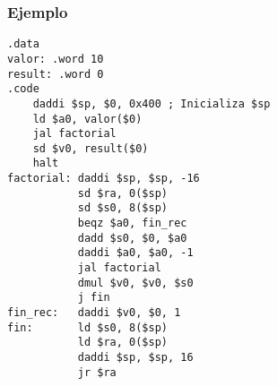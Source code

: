 \documentclass{beamer}
\begin{document}
\begin{frame}[fragile]
\frametitle{Ejemplo}
\tiny{
\begin{block}{}
\begin{lstlisting}[basicstyle=\ttfamily,keywordstyle=\color{blue}]
.data
valor: .word 10
result: .word 0
.code
    daddi $sp, $0, 0x400 ; Inicializa $sp
    ld $a0, valor($0)
    jal factorial
    sd $v0, result($0)
    halt
factorial: daddi $sp, $sp, -16
           sd $ra, 0($sp)
           sd $s0, 8($sp)
           beqz $a0, fin_rec
           dadd $s0, $0, $a0
           daddi $a0, $a0, -1
           jal factorial
           dmul $v0, $v0, $s0
           j fin		   
fin_rec:   daddi $v0, $0, 1
fin:       ld $s0, 8($sp)
           ld $ra, 0($sp)
           daddi $sp, $sp, 16
           jr $ra		   
\end{lstlisting}
\end{block}
}

\end{frame}
\end{document}

